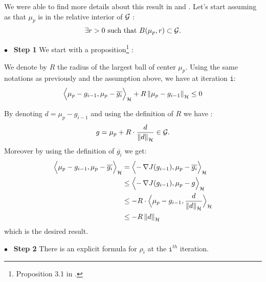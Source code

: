   We were able to find more details about this result in \cite{Beck} and \cite{Chen}.
Let's start assuming as \cite{Bach} that $\mu_p$ is in the relative interior
of $\mathcal{G}$ :
\begin{equation}
\exists r>0 \text{ such that } B(\mu_p, r) \subset \mathcal{G}.
\end{equation}



{$\bullet$~\normalfont\bfseries\color{myorange!90!black} Step 1 }We start with a proposition\footnote{Proposition 3.1 in \cite{Beck}.} :
\begin{boxtheorem}
  We denote by $R$ the radius of the largest ball of center $\mu_p$.
  Using the same notations as previously and the assumption above, we have at
  iteration \texttt{i}:
  \begin{equation}
    \label{eq:18}
    \Bigps{\mu_p-g_{i-1}}{\mu_p-\overline{g_{i}}}+R \norme{\mu_p-g_{i-1}} \leq 0
  \end{equation}
\end{boxtheorem}

\begin{boxcomputation}
  By denoting $d = \mu_p-g_{i-1}$ and using the definition of $R$ we have :
\begin{equation*}
  g = \mu_p+R\cdot \frac{d}{\norme{d}} \in \G.
\end{equation*}
Moreover by using the definition of $\overline{g_{i}}$ we get:
  \begin{align*}
\Bigps{\mu_p-g_{i-1}}{\mu_p-\overline{g_{i}}} &=
\Bigps{-\grad{J(g_{i-1})}}{\mu_p-\overline{g_{i}}}\\&\leq
\Bigps{-\grad{J(g_{i-1})}}{\mu_p-g}\\
&\leq -R\cdot\Bigps{\mu_p-g_{i-1}}{\frac{d}{\norme{d}}}\\
&\leq -R \norme{d}
  \end{align*}
  which is the desired result.
\end{boxcomputation}

{$\bullet$~\normalfont\bfseries\color{myorange!90!black} Step 2 } There is an
 explicit formula for $\rho_i$ at the $\texttt{i}^{th}$ iteration.

